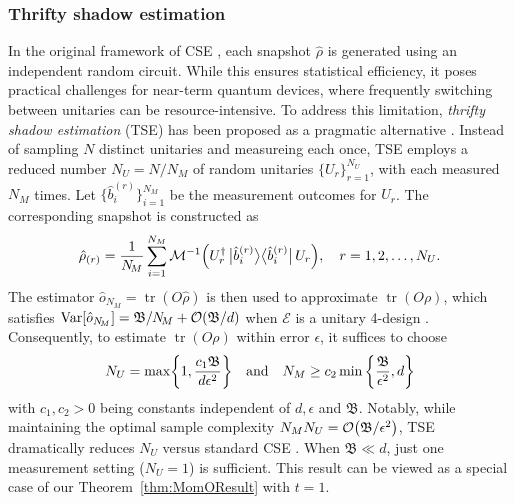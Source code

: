 \documentclass[aps,prl,twocolumn,nofootinbib,superscriptaddress,10pt]{revtex4-2}
\let\originalleft\left
\let\originalright\right
\renewcommand{\left}{\mathopen{}\mathclose\bgroup\originalleft}
\renewcommand{\right}{\aftergroup\egroup\originalright}
\def\>{\rangle}
\def\<{\langle}
\DeclareMathOperator{\Var}{Var}
\DeclareMathOperator{\Tr}{tr}
\newcommand{\bigo}[1]{\mathcal{O}\left(#1\right)}
\theoremstyle{plain}
\theoremstyle{definition}
\newcommand{\tref}[1]{Theorem~\ref{#1}}
\begin{document}
\subsubsection{Thrifty shadow estimation}
In the original framework of CSE \cite{HKPshadow20}, each snapshot $\hat\rho$ is generated using an independent random circuit. While this ensures statistical efficiency, it poses practical challenges for near-term quantum devices, where frequently switching between unitaries can be resource-intensive.  
To address this limitation, \emph{thrifty shadow estimation} (TSE) has been proposed as a pragmatic alternative \cite{PhysRevLett.131.240602,Zhou2023perform,Datong24}. Instead of sampling \(N\) distinct unitaries and measureing each once, TSE employs a reduced number \(N_U= N/N_{\!M} \) of random unitaries $\{U_r\}_{r=1}^{N_U}$, with each measured \(N_{\!M}\) times.  
Let $\big\{\hat{b}_i^{(r)}\big\}_{i=1}^{N_M}$ be the measurement outcomes for $U_{r}$. The corresponding snapshot is constructed as 
\begin{align}
\hat\rho_{(r)}
= \frac{1}{N_{\!M}} \sum_{i=1}^{N_{M}} \mathcal{M}^{-1}\left(U_{r}^{\dag}\,\big|\hat{b}_i^{(r)}\big\>\big\<\hat{b}_i^{(r)}\big| \, 
U_{r}\right), 
\quad r=1,2,\dots,N_U.   
\end{align} 
The estimator $\hat{o}_{N_{\!M}}=\Tr(O\hat\rho)$ is then used to approximate $\Tr(O\rho)$, 
which satisfies $\Var\left[\hat{o}_{N_{\!M}}\right]
= \mathfrak{B}/N_{\!M} + \bigo{\mathfrak{B}/d}$ when $\mathcal E$ is a unitary 4-design \cite{PhysRevLett.131.240602}.  
Consequently, to estimate $\Tr(O\rho)$ within error $\epsilon$, it suffices to choose 
\begin{align} 
N_U = \max\left\lbrace 1, \dfrac{c_1 \mathfrak{B}}{d\epsilon^2} \right\rbrace 
\quad \text{and} \quad 
N_M \geq  c_2  \min\bigg\lbrace \frac{\mathfrak{B}}{\epsilon^2}, d \bigg\rbrace
\end{align}
with $c_1,c_2>0$ being constants independent of $d,\epsilon$ and $\mathfrak{B}$. Notably, while maintaining the optimal sample complexity $N_MN_U=\bigo{\mathfrak{B}/\epsilon^2}$, TSE dramatically reduces $N_U$ versus standard CSE \cite{HKPshadow20}. When $\mathfrak{B}\ll d$, just one measurement setting ($N_U=1$) is sufficient.  
This result can be viewed as a special case of our \tref{thm:MomOResult} with $t=1$. 


\end{document}
